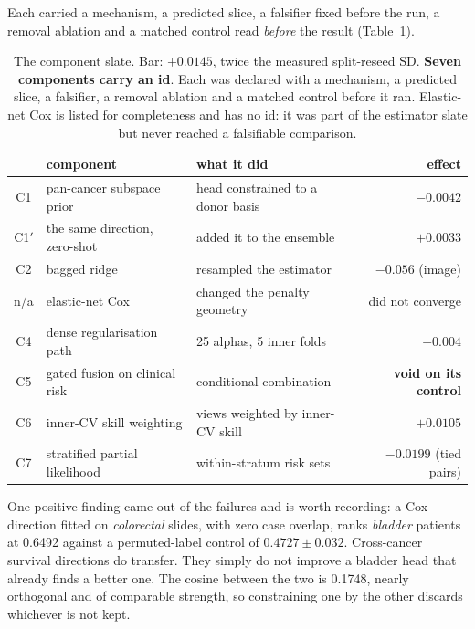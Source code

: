 \documentclass[unnumsec,webpdf,contemporary,large]{oup-authoring-template}
\begin{document}
Each carried a mechanism, a predicted slice, a falsifier fixed before the run, a removal ablation
and a matched control read \emph{before} the result (Table~\ref{tab:components}).

\begin{table}[t]
\centering
\caption{The component slate. Bar: $+0.0145$, twice the measured split-reseed SD. \textbf{Seven
components carry an id}. Each was declared with a mechanism, a predicted slice, a falsifier, a
removal ablation and a matched control before it ran. Elastic-net Cox is listed for completeness and
has no id: it was part of the estimator slate but never reached a falsifiable comparison.}
\label{tab:components}
{\small
\begin{tabular}{cllr}
\toprule
 & component & what it did & effect \\
\midrule
C1  & pan-cancer subspace prior        & head constrained to a donor basis & $-0.0042$ \\
C1$'$ & the same direction, zero-shot    & added it to the ensemble & $+0.0033$ \\
C2  & bagged ridge                       & resampled the estimator      & $-0.056$ (image) \\
n/a & elastic-net Cox                    & changed the penalty geometry & did not converge \\
C4  & dense regularisation path          & 25 alphas, 5 inner folds     & $-0.004$ \\
C5  & gated fusion on clinical risk      & conditional combination      & \textbf{void on its control} \\
C6  & inner-CV skill weighting           & views weighted by inner-CV skill & $+0.0105$ \\
C7  & stratified partial likelihood      & within-stratum risk sets     & $-0.0199$ (tied pairs) \\
\bottomrule
\end{tabular}}
\end{table}

One positive finding came out of the failures and is worth recording: a Cox direction fitted on
\emph{colorectal} slides, with zero case overlap, ranks \emph{bladder} patients at 0.6492 against a
permuted-label control of $0.4727 \pm 0.032$. Cross-cancer survival directions do transfer. They
simply do not improve a bladder head that already finds a better one. The cosine between the two
is 0.1748, nearly orthogonal and of comparable strength, so constraining one by the other discards
whichever is not kept.
\end{document}
